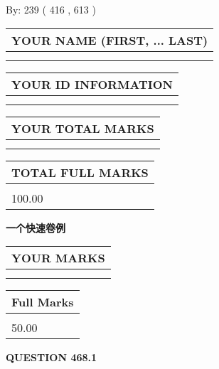 \documentclass{ctexart}
\begin{document}
   
\hspace{1.0in} By: 
 239 ( 416 ,  613 )
   
   
   
   
\newpage 
\setcounter{page}{ 
   468001 } 
   
   
   
   
\noindent\begin{tabular}{|l|}
\hline
YOUR NAME (FIRST, ... LAST)  \\
\hline
 \\ 
 \\ 
\hline
\end{tabular}
\hspace{0.05in} \begin{tabular}{|l|}
\hline
 YOUR   ID   INFORMATION  \\
\hline
 \\ 
 \\ 
\hline
\end{tabular}
   
   
\vspace{0.2in}\noindent\begin{tabular}{|l|}
\hline
YOUR TOTAL MARKS  \\
\hline
 \\ 
 \\ 
\hline
\end{tabular}
\hspace{0.05in} \begin{tabular}{|l|}
\hline
TOTAL FULL MARKS  \\
\hline
 \\ 
100.00 \\
\hline
\end{tabular}
   
   
 \vspace{0.2in}
{\LARGE {\textbf{ 一个快速卷例}}}
   
   
  
\vspace{0.2in}
  
\noindent\begin{tabular}{|l|}
\hline
 YOUR MARKS  \\
\hline
 \\ 
 \\ 
\hline
\end{tabular}
\hspace{0.05in} \begin{tabular}{|l|}
\hline
 Full Marks  \\
\hline
 \\ 
50.00 \\
\hline
\end{tabular}
{\textbf{\Large{QUESTION
468.1 
}}}
  
\end{document}
